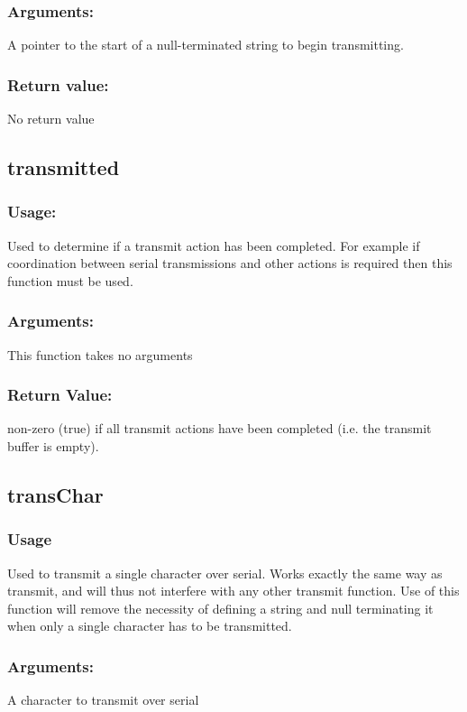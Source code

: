\documentclass[]{report}
\begin{document}
\subsubsection{Arguments:}
A pointer to the start of a null-terminated string to begin transmitting.

\subsubsection{Return value:}
No return value

\subsection{transmitted}
\subsubsection{Usage:}
Used to determine if a transmit action has been completed. For example if coordination between serial transmissions and other actions is required then this function must be used.

\subsubsection{Arguments:}
This function takes no arguments

\subsubsection{Return Value:}
non-zero (true) if all transmit actions have been completed (i.e. the transmit buffer is empty).

\subsection{transChar}
\subsubsection{Usage}
Used to transmit a single character over serial. Works exactly the same way as transmit, and will thus not interfere with any other transmit function. Use of this function will remove the necessity of defining a string and null terminating it when only a single character has to be transmitted.

\subsubsection{Arguments:}
A character to transmit over serial
\end{document}
